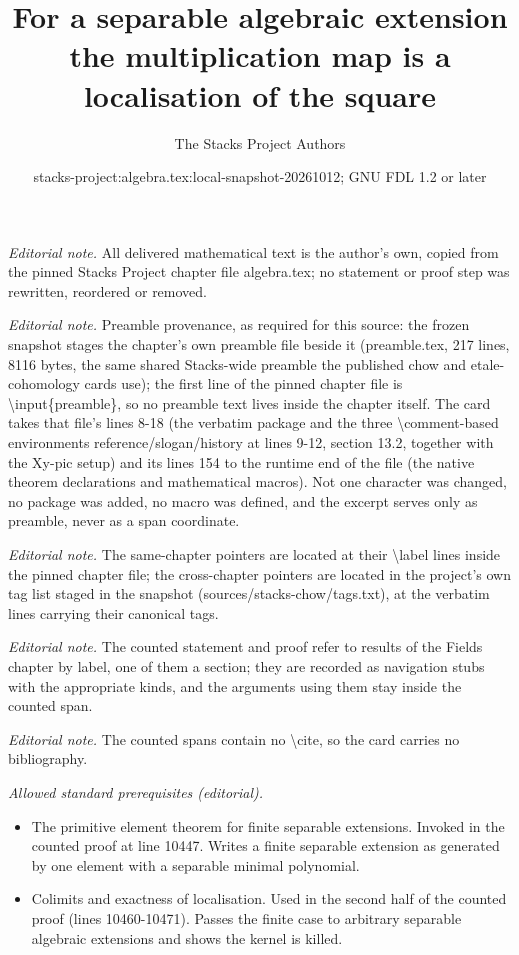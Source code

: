 \documentclass[10pt,a4paper]{amsart}
\title{For a separable algebraic extension the multiplication map is a localisation of the square}
\author{The Stacks Project Authors}
\date{stacks-project:algebra.tex:local-snapshot-20261012; GNU FDL 1.2 or later}
\theoremstyle{plain}
\theoremstyle{definition}
\theoremstyle{remark}
\numberwithin{equation}{subsection}
\begin{document}
\maketitle
\noindent\textit{Editorial note.} All delivered mathematical text is the author's own, copied from the pinned Stacks Project chapter file algebra.tex; no statement or proof step was rewritten, reordered or removed.\par\medskip
\noindent\textit{Editorial note.} Preamble provenance, as required for this source: the frozen snapshot stages the chapter's own preamble file beside it (preamble.tex, 217 lines, 8116 bytes, the same shared Stacks-wide preamble the published chow and etale-cohomology cards use); the first line of the pinned chapter file is \textbackslash{}input\{preamble\}, so no preamble text lives inside the chapter itself. The card takes that file's lines 8-18 (the verbatim package and the three \textbackslash{}comment-based environments reference/slogan/history at lines 9-12, section 13.2, together with the Xy-pic setup) and its lines 154 to the runtime end of the file (the native theorem declarations and mathematical macros). Not one character was changed, no package was added, no macro was defined, and the excerpt serves only as preamble, never as a span coordinate.\par\medskip
\noindent\textit{Editorial note.} The same-chapter pointers are located at their \textbackslash{}label lines inside the pinned chapter file; the cross-chapter pointers are located in the project's own tag list staged in the snapshot (sources/stacks-chow/tags.txt), at the verbatim lines carrying their canonical tags.\par\medskip
\noindent\textit{Editorial note.} The counted statement and proof refer to results of the Fields chapter by label, one of them a section; they are recorded as navigation stubs with the appropriate kinds, and the arguments using them stay inside the counted span.\par\medskip
\noindent\textit{Editorial note.} The counted spans contain no \textbackslash{}cite, so the card carries no bibliography.\par\medskip
\noindent\textit{Allowed standard prerequisites (editorial).}\begin{itemize}
\item The primitive element theorem for finite separable extensions. Invoked in the counted proof at line 10447. Writes a finite separable extension as generated by one element with a separable minimal polynomial.
\item Colimits and exactness of localisation. Used in the second half of the counted proof (lines 10460-10471). Passes the finite case to arbitrary separable algebraic extensions and shows the kernel is killed.
\end{itemize}\medskip
\end{document}
